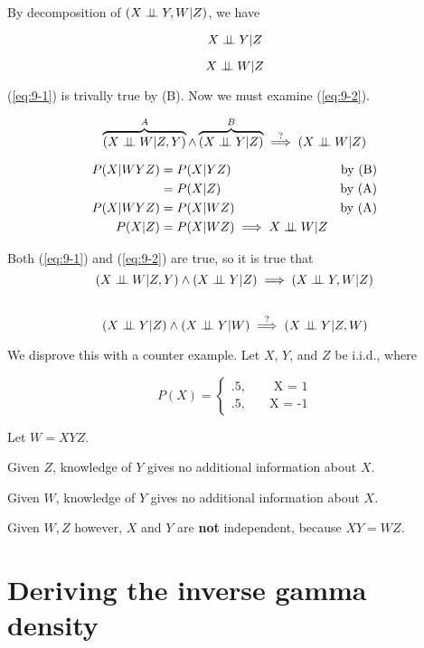 \documentclass{article}
\begin{document}
By decomposition of $(X \perp\!\!\!\perp Y,W | Z)$, we have

\begin{equation} \label{eq:9-1}
  X \perp\!\!\!\perp Y | Z
\end{equation}

\begin{equation} \label{eq:9-2}
  X \perp\!\!\!\perp W | Z
\end{equation}

(\ref{eq:9-1}) is trivally true by (B). Now we must examine
(\ref{eq:9-2}).

\[
\overbrace{(X \ci W | Z,Y)}^{A} \wedge \overbrace{(X \ci Y | Z)}^{B}
\stackrel{?}{\implies} (X \ci W | Z)
\]

\begin{align*}
  P(X|WYZ) &= P(X|YZ) \quad &\text{by (B)} \\
  &= P(X|Z) \quad &\text{by (A)} \\
  P(X|WYZ) &= P(X|WZ) \quad &\text{by (A)} \\
  P(X|Z) &= P(X|WZ) \implies X \perp\!\!\!\perp W | Z
\end{align*}

Both (\ref{eq:9-1}) and (\ref{eq:9-2}) are true, so it is true that
\[
(X \ci W | Z,Y) \wedge (X \ci Y | Z) \implies (X \ci Y,W | Z)
\]

\subsection{}

\[
(X \ci Y | Z) \wedge (X \ci Y | W) \stackrel{?}{\implies} (X \ci Y | Z,W)
\]

We disprove this with a counter example. Let $X$, $Y$, and $Z$ be
i.i.d., where

\[
P(X) =
\begin{cases}
.5, \quad &\text{ X = 1} \\
.5, \quad &\text{X = -1}
\end{cases}
\]

Let $W = XYZ$.

\par
Given $Z$, knowledge of $Y$ gives no additional information about $X$.
\par
Given $W$, knowledge of $Y$ gives no additional information about $X$.
\par
Given $W,Z$ however, $X$ and $Y$ are \textbf{not} independent, because
$XY = WZ$.

\section{Deriving the inverse gamma density}
\end{document}
